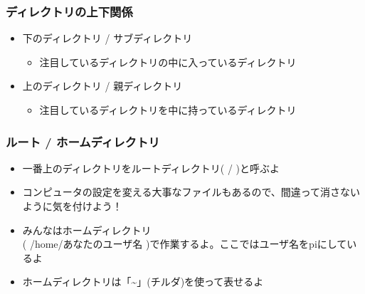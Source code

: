 \documentclass[slide03.tex]{subfiles}
\begin{document}
\begin{frame}
    \frametitle{ディレクトリの上下関係}
    \begin{itemize}
        \item 下のディレクトリ / サブディレクトリ
        \begin{itemize}
            \item 注目しているディレクトリの中に入っているディレクトリ
        \end{itemize}
        \item 上のディレクトリ / 親ディレクトリ
        \begin{itemize}
            \item 注目しているディレクトリを中に持っているディレクトリ
        \end{itemize}
    \end{itemize}
    \begin{figure}[h]
        \centering
        
    \end{figure}
\end{frame}

\begin{frame}
    \frametitle{ルート / ホームディレクトリ}
    \begin{minipage}{0.45\hsize}
        \footnotesize
        \centering
        
        \begin{itemize}
            \item 一番上のディレクトリをルートディレクトリ( / )と呼ぶよ
            \item コンピュータの設定を変える大事なファイルもあるので、間違って消さないように気を付けよう！
        \end{itemize}
    \end{minipage}
    \begin{minipage}{0.45\hsize}
        \footnotesize
        \centering
        
        \begin{itemize}
            \item みんなはホームディレクトリ\\( /home/あなたのユーザ名 )で作業するよ。ここではユーザ名をpiにしているよ
            \item ホームディレクトリは「\textasciitilde」(チルダ)を使って表せるよ
        \end{itemize}
    \end{minipage}
\end{frame}
\end{document}

